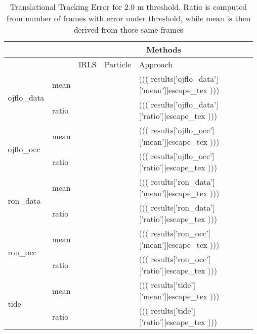 \begin{table}[]
\centering
\caption{Translational Tracking Error for 2.0 m threshold. Ratio is computed from number of frames with error under threshold, while mean is then derived from those same frames}
\label{my-label}
\begin{tabular}{lllll}

                             &                            & \multicolumn{3}{c}{Methods}                                                   \\ \hline
                             &                            & IRLS                  & Particle              & Approach                      \\ \hline
\multirow{2}{*}{ojflo\_data} & \multicolumn{1}{l|}{mean}  & \multicolumn{1}{l|}{} & \multicolumn{1}{l|}{} & \multicolumn{1}{l|}{(((  results['ojflo_data']['mean']|escape_tex )))}  \\ \cline{2-5} 
                             & \multicolumn{1}{l|}{ratio} & \multicolumn{1}{l|}{} & \multicolumn{1}{l|}{} & \multicolumn{1}{l|}{(((  results['ojflo_data']['ratio']|escape_tex )))}  \\ \hline
\multirow{2}{*}{ojflo\_occ}  & \multicolumn{1}{l|}{mean}  & \multicolumn{1}{l|}{} & \multicolumn{1}{l|}{} & \multicolumn{1}{l|}{(((  results['ojflo_occ']['mean']|escape_tex )))} \\ \cline{2-5} 
                             & \multicolumn{1}{l|}{ratio} & \multicolumn{1}{l|}{} & \multicolumn{1}{l|}{} & \multicolumn{1}{l|}{(((  results['ojflo_occ']['ratio']|escape_tex )))}  \\ \hline
\multirow{2}{*}{ron\_data}   & \multicolumn{1}{l|}{mean}  & \multicolumn{1}{l|}{} & \multicolumn{1}{l|}{} & \multicolumn{1}{l|}{(((  results['ron_data']['mean']|escape_tex )))} \\ \cline{2-5} 
                             & \multicolumn{1}{l|}{ratio} & \multicolumn{1}{l|}{} & \multicolumn{1}{l|}{} & \multicolumn{1}{l|}{(((  results['ron_data']['ratio']|escape_tex )))}  \\ \hline
\multirow{2}{*}{ron\_occ}    & \multicolumn{1}{l|}{mean}  & \multicolumn{1}{l|}{} & \multicolumn{1}{l|}{} & \multicolumn{1}{l|}{(((  results['ron_occ']['mean']|escape_tex )))} \\ \cline{2-5} 
                             & \multicolumn{1}{l|}{ratio} & \multicolumn{1}{l|}{} & \multicolumn{1}{l|}{} & \multicolumn{1}{l|}{(((  results['ron_occ']['ratio']|escape_tex )))}  \\ \hline
\multirow{2}{*}{tide}        & \multicolumn{1}{l|}{mean}  & \multicolumn{1}{l|}{} & \multicolumn{1}{l|}{} & \multicolumn{1}{l|}{(((  results['tide']['mean']|escape_tex )))} \\ \cline{2-5} 
                             & \multicolumn{1}{l|}{ratio} & \multicolumn{1}{l|}{} & \multicolumn{1}{l|}{} & \multicolumn{1}{l|}{(((  results['tide']['ratio']|escape_tex )))}  \\ \hline
\end{tabular}
\end{table}